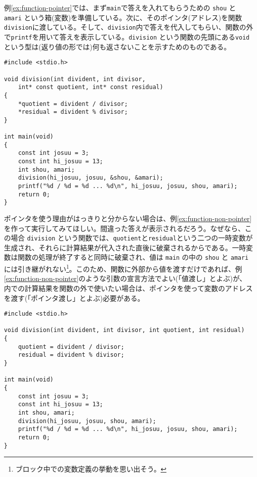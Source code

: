 例\ref{ex:function-pointer}では、まず\texttt{main}で答えを入れてもらうための \texttt{shou} と \texttt{amari} という箱(変数)を準備している。次に、そのポインタ(アドレス)を関数\texttt{division}に渡している。そして、\texttt{division}内で答えを代入してもらい、関数の外で\texttt{printf}を用いて答えを表示している。\texttt{division} という関数の先頭にある\texttt{void}という型は(返り値の形では)何も返さないことを示すためのものである。
\begin{reidai}\label{ex:function-pointer}
    \begin{verbatim}
#include <stdio.h>

void division(int divident, int divisor,
    int* const quotient, int* const residual)
{
    *quotient = divident / divisor;
    *residual = divident % divisor;
}

int main(void)
{
    const int josuu = 3;
    const int hi_josuu = 13;
    int shou, amari;
    division(hi_josuu, josuu, &shou, &amari);
    printf("%d / %d = %d ... %d\n", hi_josuu, josuu, shou, amari);
    return 0;
}
\end{verbatim}
\end{reidai} \noindent
ポインタを使う理由がはっきりと分からない場合は、例\ref{ex:function-non-pointer}を作って実行してみてほしい。間違った答えが表示されるだろう。なぜなら、この場合 \texttt{division} という関数では、\texttt{quotient}と\texttt{residual}という二つの一時変数が生成され、それらに計算結果が代入された直後に破棄されるからである。一時変数は関数の処理が終了すると同時に破棄され、値は \texttt{main} の中の \texttt{shou} と \texttt{amari} には引き継がれない\footnote{ブロック中での変数定義の挙動を思い出そう。}。このため、関数に外部から値を渡すだけであれば、例\ref{ex:function-non-pointer}のような引数の宣言方法でよい(「値渡し」とよぶ)が、内での計算結果を関数の外で使いたい場合は、ポインタを使って変数のアドレスを渡す(「ポインタ渡し」とよぶ)必要がある。
\begin{reidai}\label{ex:function-non-pointer}
    \begin{verbatim}
#include <stdio.h>

void division(int divident, int divisor, int quotient, int residual)
{
    quotient = divident / divisor;
    residual = divident % divisor;
}

int main(void)
{
    const int josuu = 3;
    const int hi_josuu = 13;
    int shou, amari;
    division(hi_josuu, josuu, shou, amari);
    printf("%d / %d = %d ... %d\n", hi_josuu, josuu, shou, amari);
    return 0;
}
\end{verbatim}
\end{reidai}

